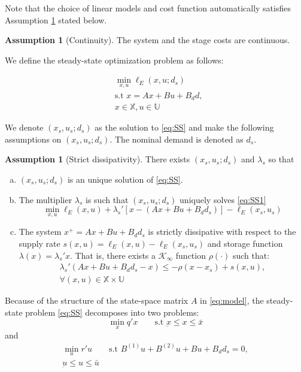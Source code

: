 \documentclass[10pt]{article}
\theoremstyle{definition}
\newtheorem{assumption}[theorem]{Assumption}
\begin{document}
Note that the choice of linear models and cost function automatically satisfies Assumption \ref{ass:cont}
stated below.

\begin{assumption}[Continuity]
\label{ass:cont}
The system and the stage costs are  continuous.
\end{assumption}

We define the steady-state optimization problem as follows:

\begin{align}
\label{eq:SS}
&\min_{x,u}{\ell_E(x,u;d_s)}  \nonumber \\ &\text{s.t~} x = Ax+Bu+B_dd, \\&x \in
\mathbb{X}, u \in \mathbb{U} \nonumber
\end{align}

We denote $(x_s,u_s;d_s)$ as the solution to \eqref{eq:SS} and make the
following assumptions on $(x_s,u_s;d_s)$. The nominal demand is
denoted as $d_s$.

\begin{assumption}[Strict dissipativity]
\label{ass:strict_dissipativity}
There exists $(x_s,u_s;d_s)$ and $\lambda_s$ so that 
\begin{enumerate}[(a)]
\item $(x_s,u_s;d_s)$  is an unique solution of \eqref{eq:SS}.
\item The multiplier $\lambda_s$ is such that $(x_s,u_s;d_s)$
  uniquely solves \eqref{eq:SS1}
\begin{equation}
\label{eq:SS1}
\min_{x,u}{\ell_E(x,u)+\lambda_s'[x-(Ax+Bu+B_dd_s)]-\ell_E(x_s,u_s)}
\end{equation}
\item The system $x^+=Ax+Bu+B_dd_s$ is strictly dissipative with respect
  to the supply rate $s(x,u) = \ell_E(x,u)-\ell_E(x_s,u_s)$ and
  storage function $\lambda(x) = \lambda_s'x$. That is, there exists a
  $\mathcal{K}_{\infty}$ function $\rho(\cdot)$ such that:
\begin{multline}
\label{eq:strict_dissipativity}
\lambda_s'(Ax+Bu+B_dd_s-x) \leq -\rho (x-x_s)+s(x,u),\\ \forall (x,u) \in
\mathbb{X} \times \mathbb{U}
\end{multline}
\end{enumerate}
\end{assumption}


Because of the structure of the state-space matrix $A$ in \eqref{eq:model}, the steady-state
problem \eqref{eq:SS} decomposes into two problems:
\begin{equation}
\label{eq:SSx} \min_{x}{q'x} \qquad \text{s.t~} \underbar{x} \leq x
\leq \bar{x}
\end{equation}
and
\begin{multline}
\label{eq:SSu} \min_{u}{r'u} \qquad \text{s.t~} B^{(1)}u + B^{(2)}u +
Bu + B_dd_s = 0,\\
 \underbar{u} \leq u\leq \bar{u}
\end{multline}
\end{document}
